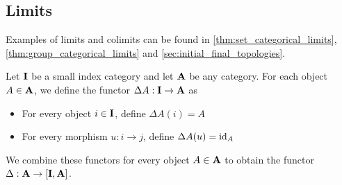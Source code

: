 \subsection{Limits}\label{sec:categorical_limits}

\begin{note}\label{def:categorical_limit_examples}
  Examples of limits and colimits can be found in \cref{thm:set_categorical_limits}, \cref{thm:group_categorical_limits} and \cref{sec:initial_final_topologies}.
\end{note}

\begin{definition}\label{def:diagonal_functor}\cite[143]{Leinster2014}
  Let \( \operatorname{\mathbf{I}} \) be a small index category and let \( \operatorname{\mathbf{A}} \) be any category. For each object \( A \in \operatorname{\mathbf{A}} \), we define the functor \( \Delta A: \operatorname{\mathbf{I}} \to \operatorname{\mathbf{A}} \) as
  \begin{itemize}
    \item For every object \( i \in \operatorname{\mathbf{I}} \), define \( \Delta A(i) = A \)
    \item For every morphism \( u: i \to j \), define \( \Delta A(u) = \operatorname{id}_A \)
  \end{itemize}

  We combine these functors for every object \( A \in \operatorname{\mathbf{A}} \) to obtain the functor \( \Delta: \operatorname{\mathbf{A}} \to [\operatorname{\mathbf{I}}, \operatorname{\mathbf{A}}] \).
\end{definition}

